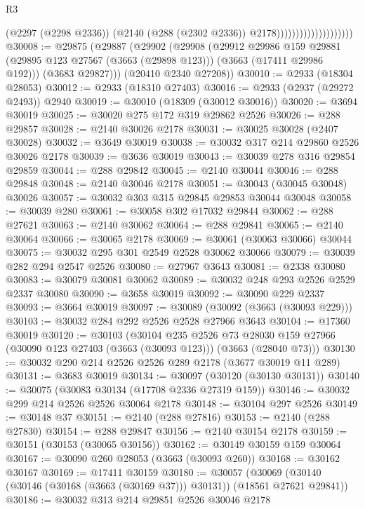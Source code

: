 \begin{lexlean}{R3}
\begin{coremodule}
                                          (@2297 (@2298 @2336))
                                          (@2140 (@288 (@2302 @2336)) @2178))))))))))))))))))))
@30008 := @29875
    (@29887
      (@29902
        (@29908
          (@29912
            @29986
            @159
            @29881
            (@29895 @123 @27567 (@3663 (@29898 @123)))
            (@3663 (@17411 @29986 @192)))
          (@3683 @29827)))
      (@20410 @2340 @27208))
@30010 := @2933 (@18304 @28053)
@30012 := @2933 (@18310 @27403)
@30016 := @2933 (@2937 (@29272 @2493)) @2940
@30019 := @30010 (@18309 (@30012 @30016))
@30020 := @3694 @30019
@30025 := @30020 @275 @172 @319 @29862 @2526
@30026 := @288 @29857
@30028 := @2140 @30026 @2178
@30031 := @30025 @30028 (@2407 @30028)
@30032 := @3649 @30019
@30038 := @30032 @317 @214 @29860 @2526 @30026 @2178
@30039 := @3636 @30019
@30043 := @30039 @278 @316 @29854 @29859
@30044 := @288 @29842
@30045 := @2140 @30044
@30046 := @288 @29848
@30048 := @2140 @30046 @2178
@30051 := @30043 (@30045 @30048) @30026
@30057 := @30032 @303 @315 @29845 @29853 @30044 @30048
@30058 := @30039 @280
@30061 := @30058 @302 @17032 @29844
@30062 := @288 @27621
@30063 := @2140 @30062
@30064 := @288 @29841
@30065 := @2140 @30064
@30066 := @30065 @2178
@30069 := @30061 (@30063 @30066) @30044
@30075 := @30032 @295 @301 @2549 @2528 @30062 @30066
@30079 := @30039 @282 @294 @2547 @2526
@30080 := @27967 @3643
@30081 := @2338 @30080
@30083 := @30079 @30081 @30062
@30089 := @30032 @248 @293 @2526 @2529 @2337 @30080
@30090 := @3658 @30019
@30092 := @30090 @229 @2337
@30093 := @3664 @30019
@30097 := @30089 (@30092 (@3663 (@30093 @229)))
@30103 := @30032 @284 @292 @2526 @2528 @27966 @3643
@30104 := @17360 @30019
@30120 := @30103
    (@30104
      @235
      @2526
      @73
      @28030
      @159
      @27966
      (@30090 @123 @27403 (@3663 (@30093 @123)))
      (@3663 (@28040 @73)))
@30130 := @30032 @290 @214 @2526 @2526 @289 @2178 (@3677 @30019 @11 @289)
@30131 := @3683 @30019
@30134 := @30097 (@30120 (@30130 @30131))
@30140 := @30075 (@30083 @30134 (@17708 @2336 @27319 @159))
@30146 := @30032 @299 @214 @2526 @2526 @30064 @2178
@30148 := @30104 @297 @2526
@30149 := @30148 @37
@30151 := @2140 (@288 @27816)
@30153 := @2140 (@288 @27830)
@30154 := @288 @29847
@30156 := @2140 @30154 @2178
@30159 := @30151 (@30153 (@30065 @30156))
@30162 := @30149 @30159 @159 @30064
@30167 := @30090 @260 @28053 (@3663 (@30093 @260))
@30168 := @30162 @30167
@30169 := @17411 @30159
@30180 := @30057
    (@30069 (@30140 (@30146 (@30168 (@3663 (@30169 @37))) @30131)) (@18561 @27621 @29841))
@30186 := @30032 @313 @214 @29851 @2526 @30046 @2178

\end{coremodule}
\end{lexlean}
